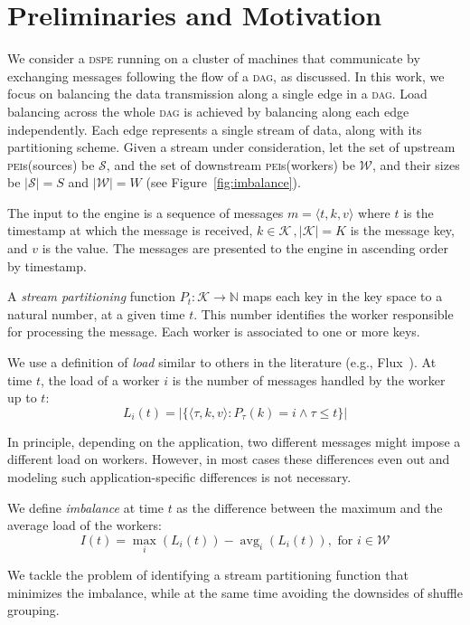 \documentclass[10pt,conference,letterpaper]{IEEEtran}
\newcommand{\tuple}[1]{\ensuremath{\langle #1 \rangle}\xspace}
\newcommand{\pei}{\textsc{pei}\xspace}
\newcommand{\peis}{{\pei}s\xspace}
\newcommand{\dspe}{\textsc{dspe}\xspace}
\newcommand{\dagr}{\textsc{dag}\xspace}
\newcommand{\sources}{\ensuremath{\mathcal{S}}\xspace}
\newcommand{\numsources}{S\xspace}
\newcommand{\workers}{\ensuremath{\mathcal{W}}\xspace}
\newcommand{\numworkers}{W\xspace}
\newcommand{\keyspace}{\ensuremath{\mathcal{K}}\xspace}
\newcommand{\keysize}{K\xspace}
\DeclareMathOperator*{\avg}{avg}
\begin{document}
 \section{Preliminaries and Motivation}
\label{sec:preliminaries}





We consider a \dspe running on a cluster of machines that communicate by exchanging messages following the flow of a \dagr, as discussed.
In this work, we focus on balancing the data transmission along a single edge in a \dagr.
Load balancing across the whole \dagr is achieved by balancing along each edge independently.
Each edge represents a single stream of data, along with its partitioning scheme.
Given a stream under consideration, let the set of upstream \peis (sources) be \sources, and the set of downstream \peis (workers) be \workers, and their sizes be $|\sources| = \numsources$ and $|\workers| = \numworkers$ (see Figure~\ref{fig:imbalance}).


The input to the engine is a sequence of messages $m = \tuple{t,k,v}$ where $t$ is the timestamp at which the message is received, $k \in \keyspace \,, |\keyspace| = \keysize$ is the message key, and $v$ is the value.
The messages are presented to the engine in ascending order by timestamp.


A {\em stream partitioning} function $P_{t}: \mathcal{K} \rightarrow \mathbb{N}$ maps each key in the key space to a natural number, at a given time $t$.
This number identifies the worker responsible for processing the message.
Each worker is associated to one or more keys.


We use a definition of \emph{load} similar to others in the literature (e.g., Flux~\citep{shah2003flux}).
At time $t$, the load of a worker $i$ is the number of messages handled by the worker up to $t$:
$$ L_i(t) = |\{ \tuple{\tau,k,v} : P_{\tau}(k) = i \wedge \tau \leq t \}| $$


In principle, depending on the application, two different messages might impose a different load on workers.
However, in most cases these differences even out and modeling such application-specific differences is not necessary.

We define {\em imbalance} at time $t$ as the difference between the maximum and the average load of the workers:
$$ I(t) = \max_{i}(L_i(t)) - \avg_{i}(L_i(t)), \text{ for } i \in \workers$$

We tackle the problem of identifying a stream partitioning function that minimizes the imbalance,
while at the same time avoiding the downsides of shuffle grouping.
\end{document}
